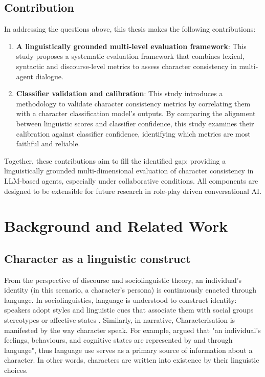 \documentclass{article}
\begin{document}
\subsection{Contribution} \label{sec:intro_contribution}

In addressing the questions above, this thesis makes the following contributions:
\begin{enumerate}
    \item \textbf{A linguistically grounded multi-level evaluation framework}: This study proposes a systematic evaluation framework that combines lexical, syntactic and discourse-level metrics to assess character consistency in multi-agent dialogue.
    \item \textbf{Classifier validation and calibration}: This study introduces a methodology to validate character consistency metrics by correlating them with a character classification model's outputs. By comparing the alignment between linguistic scores and classifier confidence, this study examines their calibration against classifier confidence, identifying which metrics are most faithful and reliable.
\end{enumerate}

Together, these contributions aim to fill the identified gap: providing a linguistically grounded multi-dimensional evaluation of character consistency in LLM-based agents, especially under collaborative conditions. All components are designed to be extensible for future research in role-play driven conversational AI.

\section{Background and Related Work} \label{sec:background}

\subsection{Character as a linguistic construct} \label{sec:background_char_in_ling}

From the perspective of discourse and sociolinguistic theory, an individual's identity (in this scenario, a character's persona) is continuously enacted through language. In sociolinguistics, language is understood to construct identity: speakers adopt styles and linguistic cues that associate them with social groups stereotypes or affective states \citep{bucholtz2005identity, norton2011identity, eckert2016variation}. Similarly, in narrative, Characterisation is manifested by the way character speak. For example, \citet{culpeper2001language} argued that "an individual's feelings, behaviours, and cognitive states are represented by and through language", thus language use serves as a primary source of information about a character. In other words, characters are written into existence by their linguistic choices.
\end{document}
